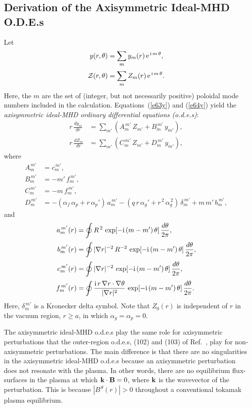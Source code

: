 \documentclass[12pt,prb,aps]{revtex4-1}
\begin{document}
\subsection{Derivation of the Axisymmetric Ideal-MHD O.D.E.s}\label{ode}
Let
\begin{align}\label{e62s}
y(r,\theta)&= \sum_m y_m(r)\,{\rm e}^{\,{\rm i}\,m\,\theta},\\[0.5ex]
{\cal Z}(r,\theta) &= \sum_m Z_m(r)\,{\rm e}^{\,{\rm i}\,m\,\theta}.\label{e63s}
\end{align}
Here, the $m$ are the set of (integer, but not necessarily positive) poloidal mode numbers included in the calculation. 
Equations~(\ref{e63y}) and (\ref{e64y}) yield the {\em axisymmetric ideal-MHD ordinary differential equations (o.d.e.s)}:
\begin{align}\label{e69u}
r\,\frac{dy_m}{dr}&= \sum_{m'}\left(A_{m}^{\,m'}\,Z_{m'} + B_{m}^{\,m'}\,y_{m'}\right),\\[0.5ex]
r\,\frac{dZ_m}{dr}&= \sum_{m'}\left(C_{m}^{\,m'}\,Z_{m'} + D_{m}^{\,m'}\,y_{m'}\right),\label{e70uu}
\end{align}
where
\begin{align}
A_m^{\,m'} &= c_{m}^{\,m'},\\[0.5ex]
B_m^{\,m'} &= - m'\,f_m^{\,m'},\\[0.5ex]
C_{m}^{\,m'} &= -m\,f_m^{\,m'},\\[0.5ex]
D_{m}^{\,m'}&= -(\alpha_f\,\alpha_p+ r\,\alpha_p')\,a_m^{\,m'} - (q\,r\,\alpha_g' +r^{\,2}\,\alpha_g^{\,2})\,\delta_m^{\,m'}+m\,m'\,b_m^{\,m'},\label{Ddef}
\end{align}
and
\begin{align}\label{e73er}
a_m^{\,m'}(r)  &=\oint R^{\,2}\,\exp[-{\rm i}\,(m-m')\,\theta]\,\frac{d\theta}{2\pi},\\[0.5ex]
b_m^{\,m'}(r)  &=\oint|\nabla r|^{-2}\, R^{-2}\,\exp[-{\rm i}\,(m-m')\,\theta]\,\frac{d\theta}{2\pi},\\[0.5ex]
c_m^{\,m'}(r)  &=\oint|\nabla r|^{-2}\,\exp[-{\rm i}\,(m-m')\,\theta]\,\frac{d\theta}{2\pi},\\[0.5ex]
f_{m}^{\,m'}(r)&= \oint \frac{{\rm i}\,r\,\nabla r\cdot\nabla\theta}{|\nabla r|^2}\,\exp[-{\rm i}\,(m-m')\,\theta]\,\frac{d\theta}{2\pi}.\label{e76er}
\end{align}
Here, $\delta_m^{\,m'}$ is a Kronecker delta symbol. Note that $Z_0(r)$ is independent of $r$ in the vacuum region, $r\geq a$,  in which
$\alpha_g=\alpha_p=0$. 

The axisymmetric ideal-MHD o.d.e.s play the same role for axisymmetric perturbations that the outer-region o.d.e.s, (102) and (103) of Ref.~, play for
non-axisymmetric perturbations. The main difference is that there are no singularities in the axisymmetric ideal-MHD o.d.e.s because an axisymmetric perturbation 
does not resonate with the plasma. In other words, there are no equilibrium flux-surfaces in the plasma at which ${\bf k}\cdot{\bf B}=0$, where ${\bf k}$ is the
wavevector of the perturbation. This is because $|B^{\,\theta}(r)|>0$ throughout a conventional tokamak plasma equilibrium. 
\end{document}
